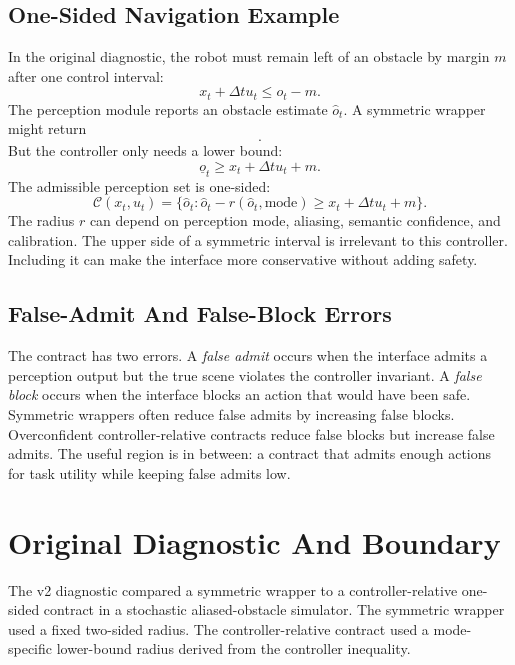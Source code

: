 \documentclass{article}
\newcommand{\ohat}{\hat{o}}
\newcommand{\olb}{\underline{o}}
\newcommand{\dt}{\Delta t}
\newcommand{\contract}{\mathcal{C}}
\begin{document}
\subsection{One-Sided Navigation Example}

In the original diagnostic, the robot must remain left of an obstacle by margin $m$ after one control interval:
\begin{equation}
    x_t+\dt u_t \leq o_t-m.
    \label{eq:safety}
\end{equation}
The perception module reports an obstacle estimate $\ohat_t$. A symmetric wrapper might return
\begin{equation}
    [\ohat_t-\epsilon,\ohat_t+\epsilon].
\end{equation}
But the controller only needs a lower bound:
\begin{equation}
    \olb_t \geq x_t+\dt u_t+m.
\end{equation}
The admissible perception set is one-sided:
\begin{equation}
    \contract(x_t,u_t)=
    \{\ohat_t:\ohat_t-r(\ohat_t,\mathrm{mode})\geq x_t+\dt u_t+m\}.
    \label{eq:onesided}
\end{equation}
The radius $r$ can depend on perception mode, aliasing, semantic confidence, and calibration. The upper side of a symmetric interval is irrelevant to this controller. Including it can make the interface more conservative without adding safety.

\subsection{False-Admit And False-Block Errors}

The contract has two errors. A \emph{false admit} occurs when the interface admits a perception output but the true scene violates the controller invariant. A \emph{false block} occurs when the interface blocks an action that would have been safe. Symmetric wrappers often reduce false admits by increasing false blocks. Overconfident controller-relative contracts reduce false blocks but increase false admits. The useful region is in between: a contract that admits enough actions for task utility while keeping false admits low.

\section{Original Diagnostic And Boundary}

The v2 diagnostic compared a symmetric wrapper to a controller-relative one-sided contract in a stochastic aliased-obstacle simulator. The symmetric wrapper used a fixed two-sided radius. The controller-relative contract used a mode-specific lower-bound radius derived from the controller inequality.
\end{document}
